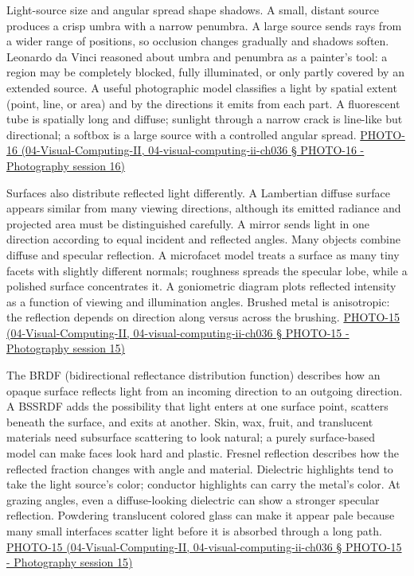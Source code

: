 Light-source size and angular spread shape shadows. A small, distant source produces a crisp umbra with a narrow penumbra. A large source sends rays from a wider range of positions, so occlusion changes gradually and shadows soften. Leonardo da Vinci reasoned about umbra and penumbra as a painter's tool: a region may be completely blocked, fully illuminated, or only partly covered by an extended source. A useful photographic model classifies a light by spatial extent (point, line, or area) and by the directions it emits from each part. A fluorescent tube is spatially long and diffuse; sunlight through a narrow crack is line-like but directional; a softbox is a large source with a controlled angular spread. \href{}{PHOTO-16 (04-Visual-Computing-II, 04-visual-computing-ii-ch036 § PHOTO-16 - Photography session 16)}

Surfaces also distribute reflected light differently. A Lambertian diffuse surface appears similar from many viewing directions, although its emitted radiance and projected area must be distinguished carefully. A mirror sends light in one direction according to equal incident and reflected angles. Many objects combine diffuse and specular reflection. A microfacet model treats a surface as many tiny facets with slightly different normals; roughness spreads the specular lobe, while a polished surface concentrates it. A goniometric diagram plots reflected intensity as a function of viewing and illumination angles. Brushed metal is anisotropic: the reflection depends on direction along versus across the brushing. \href{}{PHOTO-15 (04-Visual-Computing-II, 04-visual-computing-ii-ch036 § PHOTO-15 - Photography session 15)}

The BRDF (bidirectional reflectance distribution function) describes how an opaque surface reflects light from an incoming direction to an outgoing direction. A BSSRDF adds the possibility that light enters at one surface point, scatters beneath the surface, and exits at another. Skin, wax, fruit, and translucent materials need subsurface scattering to look natural; a purely surface-based model can make faces look hard and plastic. Fresnel reflection describes how the reflected fraction changes with angle and material. Dielectric highlights tend to take the light source's color; conductor highlights can carry the metal's color. At grazing angles, even a diffuse-looking dielectric can show a stronger specular reflection. Powdering translucent colored glass can make it appear pale because many small interfaces scatter light before it is absorbed through a long path. \href{}{PHOTO-15 (04-Visual-Computing-II, 04-visual-computing-ii-ch036 § PHOTO-15 - Photography session 15)}

